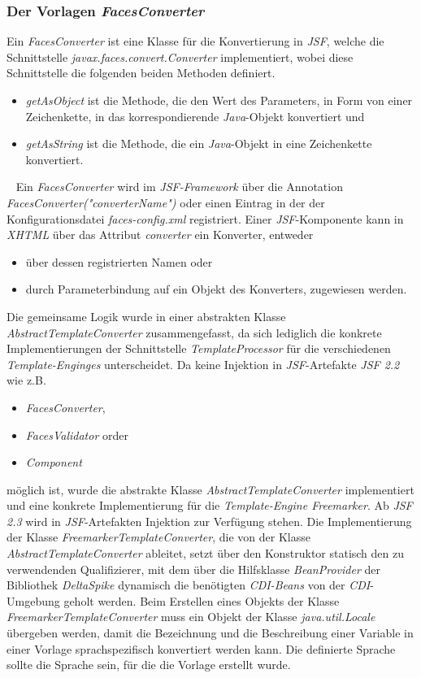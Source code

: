 \subsubsection{Der Vorlagen \emph{FacesConverter}}
Ein \emph{FacesConverter} ist eine Klasse für die Konvertierung in \emph{JSF}, welche die Schnittstelle \emph{javax.faces.convert.Converter} implementiert, wobei diese Schnittstelle die folgenden beiden Methoden definiert.
\begin{itemize}
	\item\emph{getAsObject}
	\newline
	ist die Methode, die den Wert des Parameters, in Form von einer Zeichenkette, in das korrespondierende \emph{Java}-Objekt konvertiert und
	\item\emph{getAsString}
	\newline
	ist die Methode, die ein \emph{Java}-Objekt in eine Zeichenkette konvertiert.
\end{itemize}
\ \newline
Ein \emph{FacesConverter} wird im \emph{JSF-Framework} über die Annotation \emph{FacesConverter("converterName")} oder einen Eintrag in der der Konfigurationsdatei \emph{faces-config.xml} registriert. Einer \emph{JSF}-Komponente kann in \emph{XHTML} über das Attribut \emph{converter} ein Konverter, entweder 
\begin{itemize}
	\item über dessen registrierten Namen oder 
	\item durch Parameterbindung auf ein Objekt des Konverters, zugewiesen werden.
\end{itemize}
Die gemeinsame Logik wurde in einer abstrakten Klasse \emph{AbstractTemplateConverter} zusammengefasst, da sich lediglich die konkrete Implementierungen der Schnittstelle \emph{TemplateProcessor} für die verschiedenen \emph{Template-Enginges} unterscheidet. Da keine Injektion in \emph{JSF}-Artefakte \emph{JSF 2.2} wie z.B.
\begin{itemize}
	\item\emph{FacesConverter},
	\item\emph{FacesValidator} order
	\item\emph{Component}
\end{itemize}
möglich ist, wurde die abstrakte Klasse \emph{AbstractTemplateConverter} implementiert und eine konkrete Implementierung für die \emph{Template-Engine Freemarker}. Ab \emph{JSF 2.3} wird in \emph{JSF}-Artefakten Injektion zur Verfügung stehen. Die Implementierung der Klasse \emph{FreemarkerTemplateConverter}, die von der Klasse \emph{AbstractTemplateConverter} ableitet, setzt über den Konstruktor statisch den zu verwendenden Qualifizierer, mit dem über die Hilfsklasse \emph{BeanProvider} der Bibliothek \emph{DeltaSpike} dynamisch die benötigten \emph{CDI-Beans} von der \emph{CDI}-Umgebung geholt werden. Beim Erstellen eines Objekts der Klasse \emph{FreemarkerTemplateConverter} muss ein Objekt der Klasse \emph{java.util.Locale} übergeben werden, damit die Bezeichnung und die Beschreibung einer Variable in einer Vorlage sprachspezifisch konvertiert werden kann. Die definierte Sprache sollte die Sprache sein, für die die Vorlage erstellt wurde.


